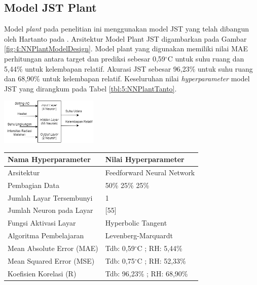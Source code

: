 \documentclass[a4paper,10pt]{article}
\makeatletter
\newenvironment{body}{\begin{multicols}{2}}{\end{multicols}}
\renewenvironment{table}
{\def\@captype{table}%
	\captionsetup{format=plain,labelsep=newline,font=footnotesize,textfont=sc,justification=centering}%
	\fontsize{8}{8}\selectfont
}
{}
\renewenvironment{figure}
{\def\@captype{figure}%
	\captionsetup{labelsep=period,format=hang,font=footnotesize,justification=justified}
}
{}
\makeatother
\begin{document}
\begin{body}
		\subsection{Model JST Plant}\label{subsec:4:err}
		
		Model \textit{plant} pada penelitian ini menggunakan model JST yang telah dibangun oleh Hartanto pada \cite{skripsiTanto}. Arsitektur Model Plant JST digambarkan pada Gambar \ref{fig:4:NNPlantModelDesign}. Model plant yang digunakan memiliki nilai MAE perhitungan antara target dan prediksi sebesar 0,59$^{\circ}$C untuk suhu ruang dan 5,44\% untuk kelembapan relatif. Akurasi JST sebesar 96,23\% untuk suhu ruang dan 68,90\% untuk kelembapan relatif. Keseluruhan nilai \textit{hyperparameter} model JST yang dirangkum pada Tabel \ref{tbl:5:NNPlantTanto}.\\
		
		\begin{figure}
			\centering
			\includegraphics[width=0.35\textwidth]{figures/NNPlantModelDesign}
			\caption{Arsitektur Model Plant JST}
			\label{fig:4:NNPlantModelDesign}
		\end{figure}
	
		\begin{table}
			\caption{Tabel Rancangan Model Plant JST\cite{skripsiTanto}}
			\label{tbl:5:NNPlantTanto}
			\centering
			\begin{tabularx}{\linewidth}{ll}\toprule
				\textbf{Nama Hyperparameter} & \textbf{Nilai Hyperparameter} \\ \toprule
				Arsitektur & Feedforward Neural Network \\ \midrule
				Pembagian Data & 50\% 25\% 25\% \\ \midrule 
				Jumlah Layar Tersembunyi & 1 \\ \midrule
				Jumlah Neuron pada Layar & [55] \\ \midrule
				Fungsi Aktivasi Layar & Hyperbolic Tangent \\ \midrule
				Algoritma Pembelajaran & Levenberg-Marquardt \\ \midrule
				Mean Absolute Error (MAE) & Tdb: 0,59$^\circ$C ; RH: 5,44\% \\ \midrule
				Mean Squared Error (MSE) & Tdb: 0,75$^\circ$C ; RH: 52,33\% \\ \midrule
				Koefisien Korelasi (R) & Tdb: 96,23\% ; RH: 68,90\% \\ \bottomrule
			\end{tabularx}
		\end{table}
		

\end{body}
\end{document}
